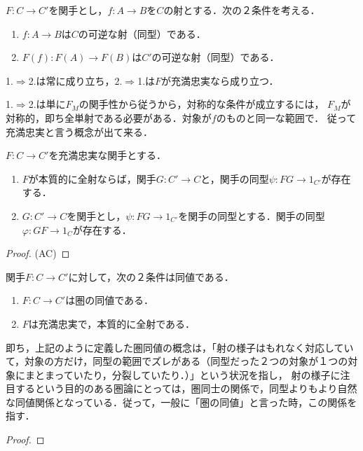 \documentclass[uplatex, dvipdfmx]{jsreport}
\begin{document}
\begin{lemma}[関手による同型射の保存性]
    $F:C\to C'$を関手とし，$f:A\to B$を$C$の射とする．次の２条件を考える．
    \begin{enumerate}
        \item $f:A\to B$は$C$の可逆な射（同型）である．

        \item $F(f):F(A)\to F(B)$は$C'$の可逆な射（同型）である．
    \end{enumerate}
    1.$\Rightarrow$2.は常に成り立ち，2.$\Rightarrow$1.は$F$が充満忠実なら成り立つ．
\end{lemma}
\begin{remark}
    1.$\Rightarrow$2.は単に$F_M$の関手性から従うから，対称的な条件が成立するには，
    $F_M$が対称的，即ち全単射である必要がある．対象が$f$のものと同一な範囲で．
    従って充満忠実と言う概念が出て来る．
\end{remark}

\begin{lemma}
    $F:C\to C'$を充満忠実な関手とする．
    \begin{enumerate}
        \item $F$が本質的に全射ならば，関手$G:C'\to C$と，関手の同型$\psi:FG\to 1_{C'}$が存在する．
        \item $G:C'\to C$を関手とし，$\psi:FG\to 1_{C'}$を関手の同型とする．関手の同型$\varphi:GF\to 1_C$が存在する．
    \end{enumerate}
\end{lemma}
\begin{proof}(AC)
    
\end{proof}

\begin{proposition}[圏の同値の特徴付け]\label{prop-charactorization of equavalence of categories}
    関手$F:C\to C'$に対して，次の２条件は同値である．
    \begin{enumerate}
        \item $F:C\to C'$は圏の同値である．
        \item $F$は充満忠実で，本質的に全射である．
    \end{enumerate}
\end{proposition}
即ち，上記のように定義した圏同値の概念は，「射の様子はもれなく対応していて，対象の方だけ，同型の範囲でズレがある（同型だった２つの対象が１つの対象にまとまっていたり，分裂していたり．）」という状況を指し，
射の様子に注目するという目的のある圏論にとっては，圏同士の関係で，同型よりもより自然な同値関係となっている．従って，一般に「圏の同値」と言った時，この関係を指す．
\begin{proof}
    
\end{proof}
\end{document}
